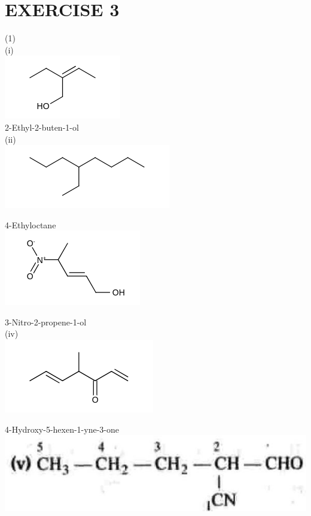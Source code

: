 \documentclass[10pt]{article}
\begin{document}
\section*{EXERCISE 3}
(1)\\
(i)\\
\includegraphics{smile-256d7734ed1a1bea94ab399ad4e07fad645f5ea5}\\
2-Ethyl-2-buten-1-ol\\
(ii)\\
\includegraphics{smile-e6efa9ad60eafa8bbcbd07d6c3cdfa7f3fbe0645}

4-Ethyloctane\\
\includegraphics{smile-ea73e0da084b73c1e0696353b7a88e72747a3c49}

3-Nitro-2-propene-1-ol\\
(iv)\\
\includegraphics{smile-4757108934ef6e5660748808916501346d860232}

4-Hydroxy-5-hexen-1-yne-3-one\\
\includegraphics[max width=\textwidth, center]{2025_01_28_8470952b98110cec3aabg-167}
\end{document}
